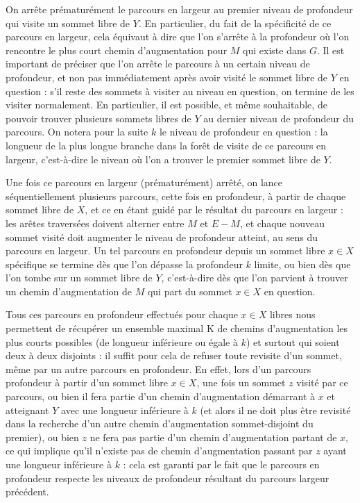  On arrête prématurément le parcours en largeur au premier niveau de profondeur qui visite un sommet libre de $Y$. En particulier, du fait de la spécificité de ce parcours en largeur, cela équivaut à dire que l'on s'arrête à la profondeur où l'on rencontre le plus court chemin d'augmentation pour $M$ qui existe dans $G$. Il est important de préciser que l'on arrête le parcours à un certain niveau de profondeur, et non pas immédiatement après avoir visité le sommet libre de $Y$ en question : s'il reste des sommets à visiter au niveau en question, on termine de les visiter normalement. En particulier, il est possible, et même souhaitable, de pouvoir trouver plusieurs sommets libres de $Y$ au dernier niveau de profondeur du parcours. On notera pour la suite $k$ le niveau de profondeur en question : la longueur de la plus longue branche dans la forêt de visite de ce parcours en largeur, c'est-à-dire le niveau où l'on a trouver le premier sommet libre de $Y$.
 
 Une fois ce parcours en largeur (prématurément) arrêté, on lance séquentiellement plusieurs parcours, cette fois en profondeur, à partir de chaque sommet libre de $X$, et ce en étant guidé par le résultat du parcours en largeur : les arêtes traversées doivent alterner entre $M$ et $E \minus M$, et chaque nouveau sommet visité doit augmenter le niveau de profondeur atteint, au sens du parcours en largeur. Un tel parcours en profondeur depuis un sommet libre $x \in X$ spécifique se termine dès que l'on dépasse la profondeur $k$ limite, ou bien dès que l'on tombe sur un sommet libre de $Y$, c'est-à-dire dès que l'on parvient à trouver un chemin d'augmentation de $M$ qui part du sommet $x \in X$ en question.
 
 Tous ces parcours en profondeur effectués pour chaque $x \in X$ libres nous permettent de récupérer un ensemble maximal K de chemins d'augmentation les plus courts possibles (de longueur inférieure ou égale à $k$) et surtout qui soient deux à deux disjoints : il suffit pour cela de refuser toute revisite d'un sommet, même par un autre parcours en profondeur. En effet, lors d'un parcours profondeur à partir d'un sommet libre $x \in X$, une fois un sommet $z$ visité par ce parcours, ou bien il fera partie d'un chemin d'augmentation démarrant à $x$ et atteignant $Y$ avec une longueur inférieure à $k$ (et alors il ne doit plus être revisité dans la recherche d'un autre chemin d'augmentation sommet-disjoint du premier), ou bien $z$ ne fera pas partie d'un chemin d'augmentation partant de $x$, ce qui implique qu'il n'existe pas de chemin d'augmentation passant par $z$ ayant une longueur inférieure à $k$ : cela est garanti par le fait que le parcours en profondeur respecte les niveaux de profondeur résultant du parcours largeur précédent.
 
